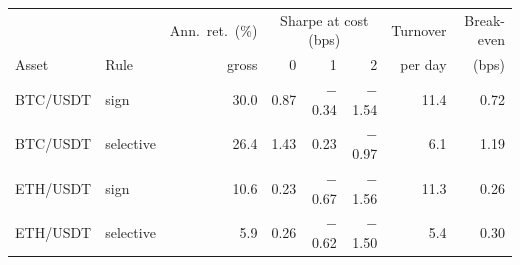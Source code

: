 \begin{tabular}{llrrrrrr}
\toprule
 & & Ann.\ ret.\ (\%) & \multicolumn{3}{c}{Sharpe at cost (bps)} & Turnover & Break-even\\
\cmidrule(lr){4-6} Asset & Rule & gross & 0 & 1 & 2 & per day & (bps)\\
\midrule
BTC/USDT & sign & 30.0 & 0.87 & \ensuremath{-}0.34 & \ensuremath{-}1.54 & 11.4 & 0.72\\
BTC/USDT & selective & 26.4 & 1.43 & 0.23 & \ensuremath{-}0.97 & 6.1 & 1.19\\
ETH/USDT & sign & 10.6 & 0.23 & \ensuremath{-}0.67 & \ensuremath{-}1.56 & 11.3 & 0.26\\
ETH/USDT & selective & 5.9 & 0.26 & \ensuremath{-}0.62 & \ensuremath{-}1.50 & 5.4 & 0.30\\
\bottomrule
\end{tabular}
